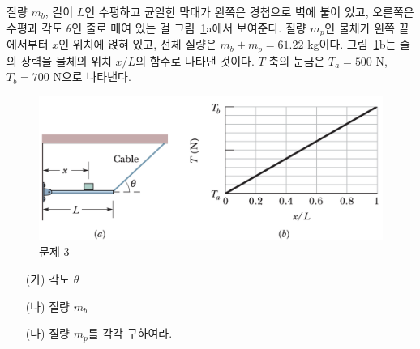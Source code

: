 \documentclass[floatfix,nofootinbib,superscriptaddress,fleqn]{revtex4-2}
\begin{document}
\vspace{1.cm}



질량 $m_b$, 길이 $L$인 수평하고 균일한 막대가 왼쪽은 경첩으로 벽에
붙어 있고, 오른쪽은 수평과 각도 $\theta$인 줄로 매여 있는 걸
그림~\ref{fig:3}a에서 보여준다. 질량 $m_p$인 물체가 왼쪽 끝에서부터
$x$인 위치에 얹혀 있고, 전체 질량은 $m_b+m_p=61.22$
kg이다. 그림~\ref{fig:3}b는 줄의 장력을 물체의 위치 $x/L$의 함수로
나타낸 것이다. $T$ 축의 눈금은 $T_a=500$ N, $T_b=700$ N으로 나타낸다. 
\begin{figure}[htbp]
  \centering
\includegraphics[scale=0.4]{Qfig15-3-20220502.png}
  \caption{문제 3}
  \label{fig:3}
\end{figure}
\begin{itemize}
\item[(가)] 각도 $\theta$
\item[(나)] 질량 $m_b$
\item[(다)] 질량 $m_p$를 각각 구하여라. 
\end{itemize}
\end{document}
